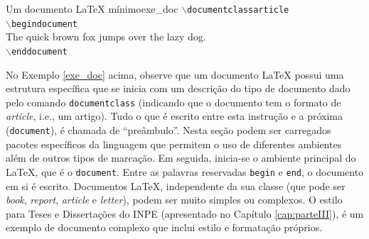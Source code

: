 
\begin{texexptitled}[listing and comment,righthand width=3cm,lower separated=false,middle=1mm,pdf comment={./snippets/teste_merge.pdf},comment style={raster columns=4,graphics pages={1,2,3,4,5,6,7,8,10,11,12,13},colframe=blue,drop fuzzy shadow}]{Um documento LaTeX mínimo}{exe_doc}
$\backslash$\texttt{documentclass{article}}\\
$\backslash$\texttt{begin{document}}\\

The quick brown fox jumps over the lazy dog.\\

$\backslash$\texttt{end{document}}
\end{texexptitled}


No Exemplo \ref{exe_doc} acima, observe que um documento LaTeX possui uma estrutura específica que se inicia com um descrição do tipo de documento dado pelo comando \texttt{documentclass} (indicando que o documento tem o formato de \textit{article}, i.e., um artigo). Tudo o que é escrito entre esta instrução e a próxima ({\tt document}), é chamada de ``preâmbulo''. Nesta seção podem ser carregados pacotes específicos da linguagem que permitem o uso de diferentes ambientes além de outros tipos de marcação. Em seguida, inicia-se o ambiente principal do LaTeX, que é o \texttt{document}. Entre as palavras reservadas \texttt{begin} e \texttt{end}, o documento em si é escrito. Documentos LaTeX, independente da sua classe (que pode ser \textit{book}, \textit{report}, \textit{article} e \textit{letter}), podem ser muito simples ou complexos. O estilo para Teses e Dissertações do INPE (apresentado no Capítulo \ref{cap:parteIII}), é um exemplo de documento complexo que inclui estilo e formatação próprios.



